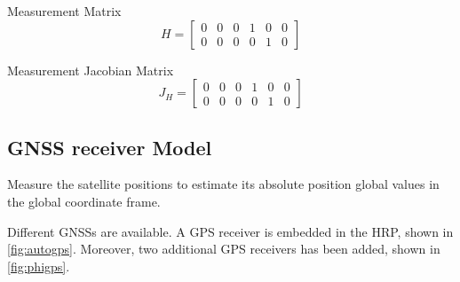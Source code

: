 Measurement Matrix
\begin{equation}
H
=
\begin{bmatrix}
0 & 0 & 0 & 1 & 0 & 0 \\
0 & 0 & 0 & 0 & 1 & 0
\end{bmatrix}
\end{equation}

Measurement Jacobian Matrix
\begin{equation}
J_H
=
\begin{bmatrix}
0 & 0 & 0 & 1 & 0 & 0 \\
0 & 0 & 0 & 0 & 1 & 0
\end{bmatrix}
\end{equation}


\subsection{GNSS receiver Model}


\noindent Measure the satellite positions to estimate its absolute position global values in the global coordinate frame.

Different \glspl{GNSS} are available.
A \gls{GPS} receiver is embedded in the \gls{HRP}, shown in \ref{fig:autogps}.
Moreover, two additional \gls{GPS} receivers has been added, shown in \ref{fig:phigps}.

